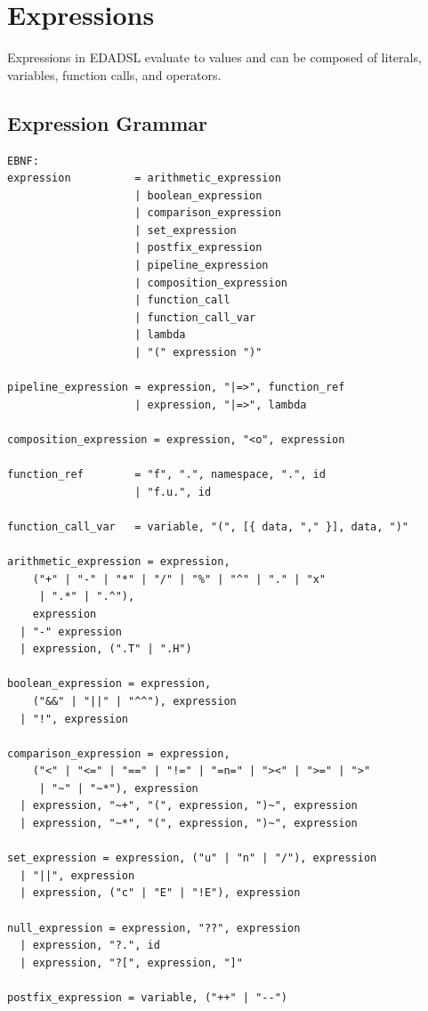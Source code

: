 \chapter{Expressions}
Expressions in EDADSL evaluate to values and can be composed of literals, variables, function calls, and operators.

\section{Expression Grammar}
\begin{verbatim}
EBNF:
expression          = arithmetic_expression
                    | boolean_expression
                    | comparison_expression
                    | set_expression
                    | postfix_expression
                    | pipeline_expression
                    | composition_expression
                    | function_call
                    | function_call_var
                    | lambda
                    | "(" expression ")"

pipeline_expression = expression, "|=>", function_ref
                    | expression, "|=>", lambda

composition_expression = expression, "<o", expression

function_ref        = "f", ".", namespace, ".", id
                    | "f.u.", id

function_call_var   = variable, "(", [{ data, "," }], data, ")"

arithmetic_expression = expression,
    ("+" | "-" | "*" | "/" | "%" | "^" | "." | "x"
     | ".*" | ".^"),
    expression
  | "-" expression
  | expression, (".T" | ".H")

boolean_expression = expression,
    ("&&" | "||" | "^^"), expression
  | "!", expression

comparison_expression = expression,
    ("<" | "<=" | "==" | "!=" | "=n=" | "><" | ">=" | ">"
     | "~" | "~*"), expression
  | expression, "~+", "(", expression, ")~", expression
  | expression, "~*", "(", expression, ")~", expression

set_expression = expression, ("u" | "n" | "/"), expression
  | "||", expression
  | expression, ("c" | "E" | "!E"), expression

null_expression = expression, "??", expression
  | expression, "?.", id
  | expression, "?[", expression, "]"

postfix_expression = variable, ("++" | "--")


\end{verbatim}
